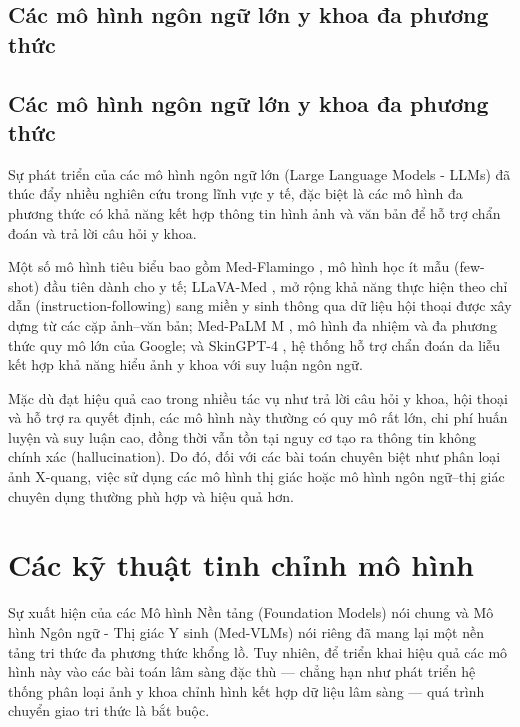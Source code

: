 \subsection{Các mô hình ngôn ngữ lớn y khoa đa phương thức}
\subsection{Các mô hình ngôn ngữ lớn y khoa đa phương thức}

Sự phát triển của các mô hình ngôn ngữ lớn (Large Language Models - LLMs) đã thúc đẩy nhiều nghiên cứu trong lĩnh vực y tế, đặc biệt là các mô hình đa phương thức có khả năng kết hợp thông tin hình ảnh và văn bản để hỗ trợ chẩn đoán và trả lời câu hỏi y khoa.

Một số mô hình tiêu biểu bao gồm Med-Flamingo \cite{moor_2023_medflamingo}, mô hình học ít mẫu (few-shot) đầu tiên dành cho y tế; LLaVA-Med \cite{li_2023_llavamed}, mở rộng khả năng thực hiện theo chỉ dẫn (instruction-following) sang miền y sinh thông qua dữ liệu hội thoại được xây dựng từ các cặp ảnh–văn bản; Med-PaLM M \cite{MED-PALM-M}, mô hình đa nhiệm và đa phương thức quy mô lớn của Google; và SkinGPT-4 \cite{SkinGPT-4}, hệ thống hỗ trợ chẩn đoán da liễu kết hợp khả năng hiểu ảnh y khoa với suy luận ngôn ngữ.

Mặc dù đạt hiệu quả cao trong nhiều tác vụ như trả lời câu hỏi y khoa, hội thoại và hỗ trợ ra quyết định, các mô hình này thường có quy mô rất lớn, chi phí huấn luyện và suy luận cao, đồng thời vẫn tồn tại nguy cơ tạo ra thông tin không chính xác (hallucination). Do đó, đối với các bài toán chuyên biệt như phân loại ảnh X-quang, việc sử dụng các mô hình thị giác hoặc mô hình ngôn ngữ–thị giác chuyên dụng thường phù hợp và hiệu quả hơn.

\section{Các kỹ thuật tinh chỉnh mô hình}

Sự xuất hiện của các Mô hình Nền tảng (Foundation Models) nói chung và Mô hình Ngôn ngữ - Thị giác Y sinh (Med-VLMs) nói riêng đã mang lại một nền tảng tri thức đa phương thức khổng lồ. Tuy nhiên, để triển khai hiệu quả các mô hình này vào các bài toán lâm sàng đặc thù — chẳng hạn như phát triển hệ thống phân loại ảnh y khoa chỉnh hình kết hợp dữ liệu lâm sàng — quá trình chuyển giao tri thức là bắt buộc.

